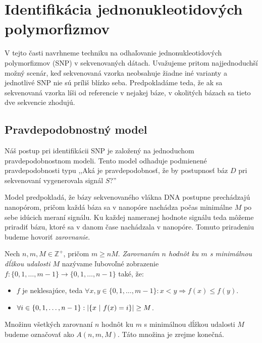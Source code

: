 \chapter{Identifikácia jednonukleotidových polymorfizmov}

\label{kap:identifikacia_SNP} 

V tejto časti navrhneme techniku na odhaľovanie jednonukleotidových
polymorfizmov (SNP) v sekvenovaných dátach. Uvažujeme pritom najjednoduchší
možný scenár, keď sekvenovaná vzorka neobsahuje žiadne iné varianty a jednotlivé
SNP nie sú príliš blízko seba. Predpokladáme teda, že ak sa sekvenovaná vzorka 
líši od referencie v nejakej báze, v okolitých bázach sa tieto dve sekvencie
zhodujú.

\section{Pravdepodobnostný model}

Náš postup pri identifikácii SNP je založený na jednoduchom pravdepodobnostnom modeli.
Tento model odhaduje podmienené pravdepodobnosti typu 
,,Aká je pravdepodobnosť, že by postupnosť báz $D$ pri sekvenovaní vygenerovala signál $S$?''

Model predpokladá, že bázy sekvenovaného vlákna DNA postupne prechádzajú nanopórom, pričom
každá báza sa v nanopóre nachádza počas minimálne $M$ po sebe idúcich meraní signálu. Ku každej
nameranej hodnote signálu teda môžeme priradiť bázu, ktoré sa v danom čase nachádzala v nanopóre.
Tomuto priradeniu budeme hovoriť \emph{zarovnanie}.

\begin{definicia}

Nech $n, m, M \in \mathbb{Z}^+$, pričom $m \geq n M$. \emph{Zarovnaním $n$ hodnôt ku $m$ s minimálnou dĺžkou udalosti $M$} nazývame ľubovoľné zobrazenie $f: \{0, 1, \dots, m-1\} \rightarrow \{0, 1, \dots, n-1\}$
také, že:

\begin{itemize}
\item $f$ je neklesajúce, teda $\forall x, y \in \{0, 1, \dots, m-1\}: x < y \Rightarrow f(x) \leq f(y)$.
\item $\forall i \in \{0, 1, \dots, n-1\}: \abs*{\{x ~|~ f(x) = i\}} \geq M$.
\end{itemize}

Množinu všetkých zarovnaní $n$ hodnôt ku $m$ s minimálnou dĺžkou udalosti $M$ budeme označovať ako
$A(n, m, M)$. Táto množina je zrejme konečná.

\end{definicia}

